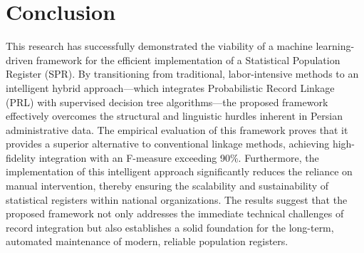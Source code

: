 \documentclass[twoside]{article}
\begin{document}
\section*{Conclusion}   
This research has successfully demonstrated the viability of a machine learning-driven framework for the efficient implementation of a Statistical Population Register (SPR). By transitioning from traditional, labor-intensive methods to an intelligent hybrid approach—which integrates Probabilistic Record Linkage (PRL) with supervised decision tree algorithms—the proposed framework effectively overcomes the structural and linguistic hurdles inherent in Persian administrative data.
The empirical evaluation of this framework proves that it provides a superior alternative to conventional linkage methods, achieving high-fidelity integration with an F-measure exceeding 90\%. Furthermore, the implementation of this intelligent approach significantly reduces the reliance on manual intervention, thereby ensuring the scalability and sustainability of statistical registers within national organizations. The results suggest that the proposed framework not only addresses the immediate technical challenges of record integration but also establishes a solid foundation for the long-term, automated maintenance of modern, reliable population registers.


\end{document}
